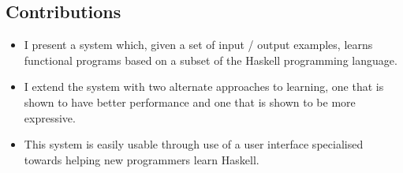 \subsection{Contributions}
\begin{itemize}
\item I present a system which, given a set of input / output examples, learns functional programs based on a subset of the Haskell programming language.
\item I extend the system with two alternate approaches to learning, one that is shown to have better performance and one that is shown to be more expressive.
\item This system is easily usable through use of a user interface specialised towards helping new programmers learn Haskell. 
\end{itemize}

\pagebreak
%
%